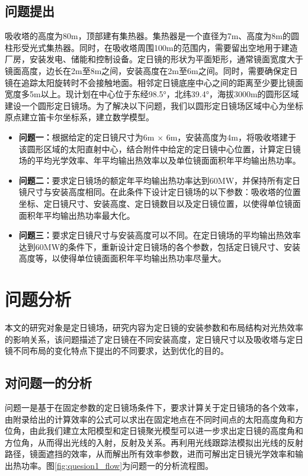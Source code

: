 \documentclass[withoutpreface,bwprint]{cumcmthesis} %
\begin{document}
\subsection{问题提出}

吸收塔的高度为80m，顶部建有集热器。集热器是一个直径为7m、高度为8m的圆柱形受光式集热器。同时，在吸收塔周围100m的范围内，需要留出空地用于建造厂房，安装发电、储能和控制设备。定日镜的形状为平面矩形，通常镜面宽度大于镜面高度，边长在2m至8m之间，安装高度在2m至6m之间。同时，需要确保定日镜在追踪太阳旋转时不会接触地面。相邻定日镜底座中心之间的距离至少要比镜面宽度多5m以上。现计划在中心位于东经98.5°，北纬39.4°，海拔3000m的圆形区域建设一个圆形定日镜场。为了解决以下问题，我们以圆形定日镜场区域中心为坐标原点建立笛卡尔坐标系，建立数学模型。


\begin{itemize}
    \item { \textbf{问题一：}根据给定的定日镜尺寸为6m $\times$ 6m，安装高度为4m，将吸收塔建于该圆形区域的太阳直射中心，结合附件中给定的定日镜中心位置，计算定日镜场的平均光学效率、年平均输出热效率以及单位镜面面积年平均输出热功率。 }
    \item { \textbf{问题二：}要求定日镜场的额定年平均输出热功率达到60MW，并保持所有定日镜尺寸与安装高度相同。在此条件下设计定日镜场的以下参数：吸收塔的位置坐标、定日镜尺寸、安装高度、定日镜数目以及定日镜位置，以使得单位镜面面积年平均输出热功率最大化。 }
    \item { \textbf{问题三：}要求定日镜尺寸与安装高度可以不同。在定日镜场的平均输出热效率达到60MW的条件下，重新设计定日镜场的各个参数，包括定日镜尺寸、安装高度等，以使得单位镜面面积年平均输出热功率尽量大。 }
\end{itemize}

\section{问题分析}

本文的研究对象是定日镜场，研究内容为定日镜的安装参数和布局结构对光热效率的影响关系，该问题描述了定日镜在不同安装高度，定日镜尺寸以及吸收塔与定日镜不同布局的变化特点下提出的不同要求，达到优化的目的。

\subsection{对问题一的分析}

问题一是基于在固定参数的定日镜场条件下，要求计算关于定日镜场的各个效率，由附录给出的计算效率的公式可以求出在固定地点在不同时间点的太阳高度角和方位角，由此我们建立太阳模型和定日镜聚光模型可以进一步求出定日镜的高度角和方位角，从而得出光线的入射，反射及关系。再利用光线跟踪法模拟出光线的反射路径，镜面遮挡的效率，从而解出所有效率参数，进而可解出定日镜光学效率和输出热功率。图\ref{fig:quesion1_flow}为问题一的分析流程图。
\end{document}
